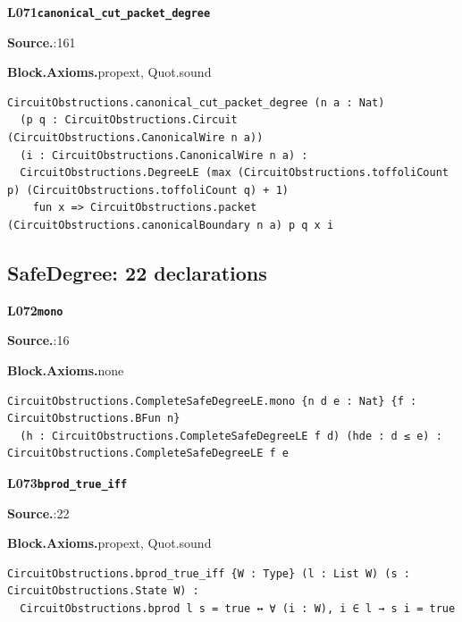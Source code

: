 \par\medskip\noindent\begin{minipage}{\textwidth}
{\small\bfseries L071\enspace\texttt{canonical\_cut\_packet\_degree}\par}
{\footnotesize\raggedright\textbf{Source.}\enspace{}:161\par
\textbf{Block.}\quad\textbf{Axioms.}\enspace propext, Quot.sound\par}\nopagebreak
\begin{lstlisting}
CircuitObstructions.canonical_cut_packet_degree (n a : Nat)
  (p q : CircuitObstructions.Circuit (CircuitObstructions.CanonicalWire n a))
  (i : CircuitObstructions.CanonicalWire n a) :
  CircuitObstructions.DegreeLE (max (CircuitObstructions.toffoliCount p) (CircuitObstructions.toffoliCount q) + 1)
    fun x => CircuitObstructions.packet (CircuitObstructions.canonicalBoundary n a) p q x i
\end{lstlisting}
\end{minipage}\par

\subsection*{SafeDegree: 22 declarations}
\par\medskip\noindent\begin{minipage}{\textwidth}
{\small\bfseries L072\enspace\texttt{mono}\par}
{\footnotesize\raggedright\textbf{Source.}\enspace{}:16\par
\textbf{Block.}\quad\textbf{Axioms.}\enspace none\par}\nopagebreak
\begin{lstlisting}
CircuitObstructions.CompleteSafeDegreeLE.mono {n d e : Nat} {f : CircuitObstructions.BFun n}
  (h : CircuitObstructions.CompleteSafeDegreeLE f d) (hde : d ≤ e) : CircuitObstructions.CompleteSafeDegreeLE f e
\end{lstlisting}
\end{minipage}\par

\par\medskip\noindent\begin{minipage}{\textwidth}
{\small\bfseries L073\enspace\texttt{bprod\_true\_iff}\par}
{\footnotesize\raggedright\textbf{Source.}\enspace{}:22\par
\textbf{Block.}\quad\textbf{Axioms.}\enspace propext, Quot.sound\par}\nopagebreak
\begin{lstlisting}
CircuitObstructions.bprod_true_iff {W : Type} (l : List W) (s : CircuitObstructions.State W) :
  CircuitObstructions.bprod l s = true ↔ ∀ (i : W), i ∈ l → s i = true
\end{lstlisting}
\end{minipage}\par


